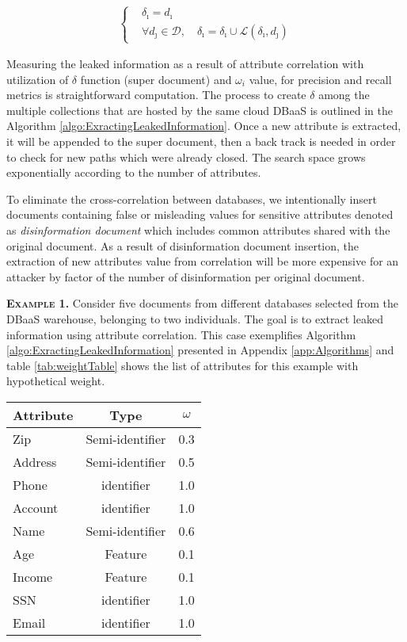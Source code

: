 \begin{equation}
\label{eq:SuperDocument}
\begin{aligned}
\begin{cases}
&\delta_{\imath}=d_\imath \\
&\forall d_\jmath \in \mathcal{D}, \quad \delta_{\imath}= \delta_{\imath} \cup \mathcal{L}(\delta_{\imath},d_\jmath)
\end{cases}
\end{aligned}
\end{equation}


Measuring the leaked information as a result of attribute correlation with utilization of $\delta$ function (super document) and $\omega_i$ value, for precision and recall metrics is straightforward computation. The process to create $\delta$ among the multiple collections that are hosted by the same cloud DBaaS is outlined in the Algorithm \ref{algo:ExractingLeakedInformation}. Once a new attribute is extracted, it will be appended to the super document, then a back track is needed in order to check for new paths which were already closed. The search space grows exponentially according to the number of attributes.

To eliminate the cross-correlation between databases, we intentionally insert documents containing false or misleading values for sensitive attributes denoted as \emph{disinformation document} which includes common attributes shared with the original document. As a result of disinformation document insertion, the extraction of new attributes value from correlation will be more expensive for an attacker by factor of the number of disinformation per original document.

\noindent \textsc{\textbf{Example 1.}} Consider five documents from different databases selected from the DBaaS warehouse, belonging to two individuals. The goal is to extract leaked information using attribute correlation. This case exemplifies Algorithm \ref{algo:ExractingLeakedInformation} presented in Appendix \ref{app:Algorithms} and table \ref{tab:weightTable} shows the list of attributes for this example with hypothetical weight.


\begin{table*}[htp]
\caption{Weights of attributes}
\label{tab:weightTable}
\centering
\begin{tabular}{lcc}
\toprule
\textbf{Attribute} & \textbf{Type} & \textbf{$\omega$}\\
\midrule
Zip      & Semi-identifier  & 0.3 \\ 
Address  & Semi-identifier  & 0.5 \\
Phone    & identifier       & 1.0 \\
Account  & identifier       & 1.0 \\
Name     & Semi-identifier  & 0.6 \\
Age      & Feature          & 0.1 \\
Income   & Feature          & 0.1 \\
SSN      & identifier       & 1.0 \\
Email    & identifier       & 1.0 \\
\bottomrule
\end{tabular}
\end{table*}

